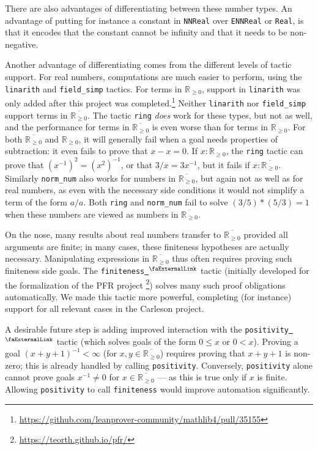 \documentclass[12pt]{amsart}
\newcommand{\lean}[1]{\lstinline{#1}}
\newcommand*{\real}{\mathbb{R}} %
\newcommand{\nnreal}{\real_{\ge0}}
\newcommand{\ennreal}{\overline{\real_{\ge0}}}
\newcommand{\extlink}{~\ensuremath{{}^\text{\faExternalLink}}}
\theoremstyle{definition}
\theoremstyle{plain}
\begin{document}
There are also advantages of differentiating between these number types.
An advantage of putting for instance a constant in \texttt{NNReal} over \texttt{ENNReal} or
\texttt{Real}, is that it encodes that the constant cannot be infinity and that it needs to be non-negative.

Another advantage of differentiating comes from the different levels of tactic support.
For real numbers, computations are much easier to perform, using the \texttt{linarith} and \texttt{field\_simp} tactics.
For terms in $\nnreal$, support in \texttt{linarith} was only added after this project was completed.\footnote{\url{https://github.com/leanprover-community/mathlib4/pull/35155}}
Neither \texttt{linarith} nor \texttt{field\_simp} support terms in $\ennreal$.
The tactic \texttt{ring} \emph{does} work for these types, but not as well, and the performance for terms in $\ennreal$ is even worse than for terms in $\nnreal$.
For both $\ennreal$ and $\nnreal$, it will generally fail when a goal needs properties of subtraction: it even fails to prove that $x - x = 0$. If $x\colon \nnreal$, the \texttt{ring} tactic can prove that $(x^{-1})^2 = (x ^ 2)^{-1}$, or that $3 / x = 3 x^{-1}$, but it fails if $x\colon \ennreal$.
Similarly \texttt{norm\_num} also works for numbers in $\ennreal$, but again not as well as for real numbers,
as even with the necessary side conditions it would not simplify a term of the form $a / a$. Both \texttt{ring} and \texttt{norm\_num} fail to solve $(3/5) * (5/3) = 1$ when these numbers are viewed as numbers in $\ennreal$.

On the nose, many results about real numbers transfer to $\ennreal$ provided all arguments are finite; in many cases, these finiteness hypotheses are actually necessary. Manipulating expressions in $\ennreal$ thus often requires proving such finiteness side goals. The \lean{finiteness}\href{https://github.com/leanprover-community/mathlib4/blob/81a5d257c8e410db227a6665ed08f64fea08e997/Mathlib/Tactic/Finiteness.lean#L73}{\extlink} tactic (initially developed for the formalization of the PFR project \footnote{\url{https://teorth.github.io/pfr/}}) solves many such proof obligations automatically. We made this tactic more powerful, completing (for instance) support for all relevant cases in the Carleson project.

A desirable future step is adding improved interaction with the \lean{positivity}\href{https://github.com/leanprover-community/mathlib4/blob/81a5d257c8e410db227a6665ed08f64fea08e997/Mathlib/Tactic/Positivity/Core.lean#L591}{\extlink} tactic (which solves goals of the form \texttt{$0 \leq x$} or \texttt{$0 < x$}). Proving a goal \texttt{$(x + y + 1)^{-1}<\infty$} (for $x,y\in\ennreal$) requires proving that $x + y + 1$ is non-zero; this is already handled by calling \lean{positivity}. Conversely, \lean{positivity} alone cannot prove goals \texttt{$x^{-1}\neq 0$} for $x\in\ennreal$ --- as this is true only if $x$ is finite. Allowing \lean{positivity} to call \lean{finiteness} would improve automation significantly.
\end{document}
